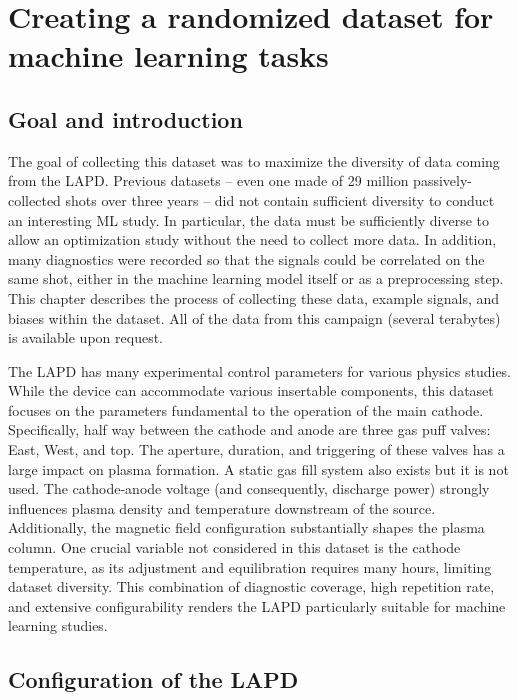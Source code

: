 \graphicspath{{Chapters/Chapter_ml-dataruns/}}

\chapter{Creating a randomized  dataset for machine learning tasks}
\label{ch:ml-dataruns}

\section{Goal and introduction}

The goal of collecting this dataset was to maximize the diversity of data coming from the LAPD. Previous datasets -- even one made of 29 million passively-collected shots over three years -- did not contain sufficient diversity to conduct an interesting ML study. In particular, the data must be sufficiently diverse to allow an optimization study without the need to collect more data. In addition, many diagnostics were recorded so that the signals could be correlated on the same shot, either in the machine learning model itself or as a preprocessing step. This chapter describes the process of collecting these data, example signals, and biases within the dataset. All of the data from this campaign (several terabytes) is available upon request. 

The LAPD has many experimental control parameters for various physics studies. While the device can accommodate various insertable components, this dataset focuses on the parameters fundamental to the operation of the main cathode. Specifically, half way between the cathode and anode are three gas puff valves: East, West, and top. The aperture, duration, and triggering of these valves has a large impact on plasma formation. A static gas fill system also exists but it is not used. The cathode-anode voltage (and consequently, discharge power) strongly influences plasma density and temperature downstream of the source. Additionally, the magnetic field configuration substantially shapes the plasma column. One crucial variable not considered in this dataset is the cathode temperature, as its adjustment and equilibration requires many hours, limiting dataset diversity. This combination of diagnostic coverage, high repetition rate, and extensive configurability renders the LAPD particularly suitable for machine learning studies. 

\section{Configuration of the LAPD}

